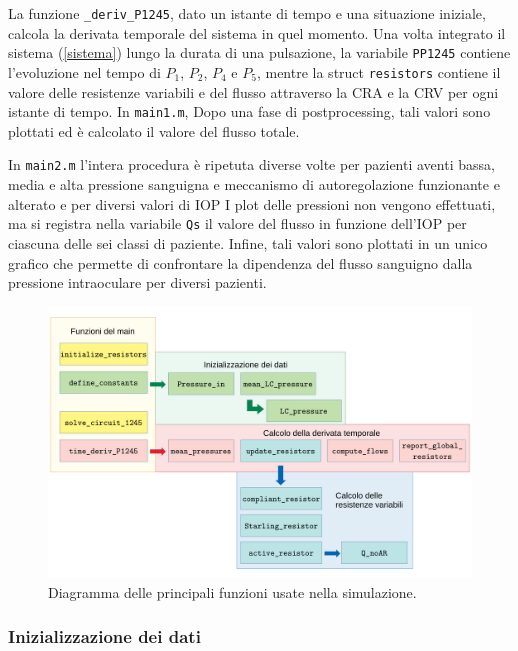 \documentclass{article}
\begin{document}
La funzione \texttt{\@time\_deriv\_P1245}, dato un istante di tempo e una situazione iniziale, calcola la derivata temporale del sistema in quel momento.
Una volta integrato il sistema (\ref{sistema}) lungo la durata di una pulsazione, la variabile \texttt{PP1245} contiene l'evoluzione nel tempo di $P_1$, $P_2$, $P_4$ e $P_5$, mentre la struct \texttt{resistors} contiene il valore delle resistenze variabili e del flusso attraverso la CRA e la CRV per ogni istante di tempo.
In \texttt{main1.m}, Dopo una fase di postprocessing, tali valori sono plottati ed è calcolato il valore del flusso totale.

In \texttt{main2.m} l'intera procedura è ripetuta diverse volte per pazienti aventi bassa, media e alta pressione sanguigna e meccanismo di autoregolazione funzionante e alterato e per diversi valori di IOP
I plot delle pressioni non vengono effettuati, ma si registra nella variabile \texttt{Qs} il valore del flusso in funzione dell'IOP per ciascuna delle sei classi di paziente.
Infine, tali valori sono plottati in un unico grafico che permette di confrontare la dipendenza del flusso sanguigno dalla pressione intraoculare per diversi pazienti.

\begin{figure}[h]
\begin{center}
\includegraphics[width=1.0\textwidth]{Pictures/class_diagram.pdf}
\caption{Diagramma delle principali funzioni usate nella simulazione.}
\label{diagramma_classi}
\end{center}
\end{figure}
\subsubsection*{Inizializzazione dei dati}
\end{document}
